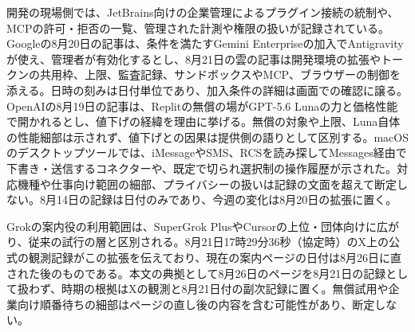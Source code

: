 \noindent 開発の現場側では、JetBrains向けの企業管理によるプラグイン接続の統制や、MCPの許可・拒否の一覧、管理された計測や権限の扱いが記録されている。Googleの8月20日の記事は、条件を満たすGemini Enterpriseの加入でAntigravityが使え、管理者が有効化するとし、8月21日の雲の記事は開発環境の拡張やトークンの共用枠、上限、監査記録、サンドボックスやMCP、ブラウザーの制御を添える。日時の刻みは日付単位であり、加入条件の詳細は画面での確認に譲る。OpenAIの8月19日の記事は、Replitの無償の場がGPT-5.6 Lunaの力と価格性能で開かれるとし、値下げの経緯を理由に挙げる。無償の対象や上限、Luna自体の性能細部は示されず、値下げとの因果は提供側の語りとして区別する。macOSのデスクトップツールでは、iMessageやSMS、RCSを読み探してMessages経由で下書き・送信するコネクターや、既定で切られ選択制の操作履歴が示された。対応機種や仕事向け範囲の細部、プライバシーの扱いは記録の文面を超えて断定しない。8月14日の記録は日付のみであり、今週の変化は8月20日の拡張に置く。 \cite{w2026w34w34eventc099,w2026w34w34eventc102,w2026w34w34eventrefreshopenaireplitgpt56luna,w2026w34w34eventc096,w2026w34w34eventc052}\par\medskip

\noindent Grokの案内役の利用範囲は、SuperGrok PlusやCursorの上位・団体向けに広がり、従来の試行の層と区別される。8月21日17時29分36秒（協定時）のX上の公式の観測記録がこの拡張を伝えており、現在の案内ページの日付は8月26日に直された後のものである。本文の典拠として8月26日のページを8月21日の記録として扱わず、時期の根拠はXの観測と8月21日付の副次記録に置く。無償試用や企業向け順番待ちの細部はページの直し後の内容を含む可能性があり、断定しない。 \cite{w2026w34w34eventc066}\par\medskip

